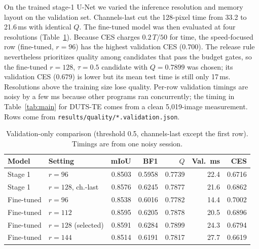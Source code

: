 \documentclass[11pt,a4paper]{article}
\begin{document}
On the trained stage-1 U-Net we varied the inference resolution and memory layout on the validation set. Channels-last cut the 128-pixel time from 33.2 to 21.6\,ms with identical $Q$. The fine-tuned model was then evaluated at four resolutions (Table~\ref{tab:res}). Because CES charges $0.2\,T/50$ for time, the speed-focused row (fine-tuned, $r=96$) has the highest validation CES ($0.700$). The release rule nevertheless prioritizes quality among candidates that pass the budget gates, so the fine-tuned $r=128$, $\tau=0.5$ candidate with $Q=0.7899$ was chosen; its validation CES ($0.679$) is lower but its mean test time is still only 17\,ms. Resolutions above the training size lose quality. Per-row validation timings are noisy by a few ms because other programs ran concurrently; the timing in Table~\ref{tab:main} for DUTS-TE comes from a clean 5{,}019-image measurement. Rows come from \texttt{results/quality/*.validation.json}.

\begin{table}[htbp]\centering\small
\begin{tabular}{llrrrrr}\toprule
Model & Setting & mIoU & BF1 & $Q$ & Val.\ ms & CES\\\midrule
Stage 1 & $r=96$ & 0.8503 & 0.5958 & 0.7739 & 22.4 & 0.6716\\
Stage 1 & $r=128$, ch.-last & 0.8576 & 0.6245 & 0.7877 & 21.6 & 0.6862\\
Fine-tuned & $r=96$ & 0.8538 & 0.6016 & 0.7782 & 14.4 & 0.7002\\
Fine-tuned & $r=112$ & 0.8595 & 0.6205 & 0.7878 & 20.5 & 0.6896\\
\rowcolor{band}Fine-tuned & $r=128$ (selected) & 0.8591 & 0.6284 & 0.7899 & 24.3 & 0.6794\\
Fine-tuned & $r=144$ & 0.8514 & 0.6191 & 0.7817 & 27.7 & 0.6619\\\bottomrule
\end{tabular}
\caption{Validation-only comparison (threshold 0.5, channels-last except the first row). Timings are from one noisy session.}\label{tab:res}
\end{table}
\end{document}
